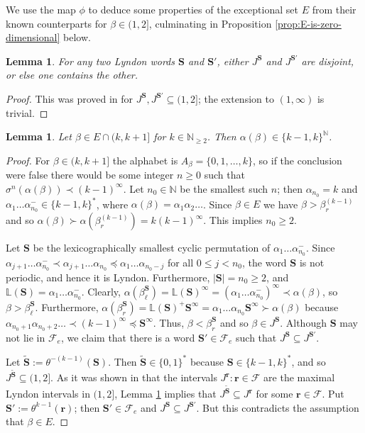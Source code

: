 \documentclass[12pt]{amsart}
\newtheorem{lemma}[theorem]{Lemma}
\theoremstyle{definition}
\theoremstyle{remark}
\numberwithin{equation}{section}
\newcommand{\N}{\ensuremath{\mathbb{N}}}
\renewcommand{\L}{\ensuremath{\mathbb{L}}}
\newcommand{\cF}{\mathcal{F}}
\newcommand{\cs}{ {\mathbf{S}}}
\renewcommand{\r}{ {\mathbf{r}}}
\newcommand{\f}{\infty}
\newcommand{\al}{\alpha}
\newcommand{\lle}{\preccurlyeq}
\newcommand{\si}{\sigma}
\begin{document}
{We use the map $\phi$ to deduce some properties of the exceptional set $E$ from their known counterparts for $\beta\in(1,2]$, culminating in Proposition \ref{prop:E-is-zero-dimensional} below.

\begin{lemma} \label{non-overlapping-intervals}
For any two Lyndon words $\cs$ and $\cs'$, either $J^\cs$ and $J^{\cs'}$ are disjoint, or else one contains the other.
\end{lemma}

\begin{proof}
This was proved in \cite{Kalle-Kong-Langeveld-Li-18} for $J^\cs, J^{\cs'}\subseteq(1,2]$; the extension to $(1,\f)$ is trivial.
\end{proof}

\begin{lemma} \label{lem:two-digits}
Let $\beta\in E\cap(k,k+1]$ for $k\in\N_{\geq 2}$. Then $\al(\beta)\in\{k-1,k\}^\N$.
\end{lemma}

\begin{proof}
For $\beta\in(k,k+1]$ the alphabet is $A_\beta=\{0,1,\dots,k\}$, so if the conclusion were false there would be some integer $n\geq 0$ such that $\si^n(\al(\beta))\prec (k-1)^\f$.  Let $n_0\in\N$ be the smallest such $n$; then $\al_{n_0}=k$ and $\al_1\dots\al_{n_0}^-\in\{k-1,k\}^*$, where $\al(\beta)=\al_1\al_2\ldots$. Since $\beta\in E$ we have $\beta>\beta_r^{(k-1)}$ and so $\al(\beta)\succ \al(\beta_r^{(k-1)})=k(k-1)^\f$. This implies $n_0\geq 2$.

Let $\cs$ be the lexicographically smallest cyclic permutation of $\al_1\dots\al_{n_0}^-$. {Since $\al_{j+1}\dots\al_{n_0}^-\prec\al_{j+1}\dots\al_{n_0}\lle \al_1\dots\al_{n_0-j}$ for all $0\le j<n_0$, the word $\cs$ is not periodic, and hence it is Lyndon.} Furthermore, $|\cs|=n_0\geq 2$, and $\L(\cs)=\al_1\dots\al_{n_0}^-$. Clearly, $\al(\beta_\ell^\cs)=\L(\cs)^\f=(\al_1\dots\al_{n_0}^-)^\f\prec\al(\beta)$, so $\beta>\beta_\ell^\cs$. Furthermore, $\al(\beta_r^\cs)=\L(\cs)^+\cs^\f=\al_1\dots\al_{n_0}\cs^\f\succ\al(\beta)$ because $\al_{n_0+1}\al_{n_0+2}\dots\prec(k-1)^\f\lle\cs^\f$. Thus, $\beta<\beta_r^\cs$ and so $\beta\in J^\cs$. Although $\cs$ may not lie in $\cF_e$, we claim that there is a word $\cs'\in\cF_e$ such that $J^\cs\subseteq J^{\cs'}$.

Let $\tilde{\cs}:=\theta^{-(k-1)}(\cs)$. Then $\tilde{\cs}\in\{0,1\}^*$ because $\cs\in\{k-1,k\}^*$, and so $J^{\tilde{\cs}}\subseteq(1,2]$. As it was shown in \cite[Proposition 4.7]{Kalle-Kong-Langeveld-Li-18} that the intervals $J^{\r}: \r\in\cF$ are the maximal Lyndon intervals in $(1,2]$, Lemma \ref{non-overlapping-intervals} implies that $J^{\tilde\cs}\subseteq J^\r$ for some $\r\in\cF$. Put $\cs':=\theta^{k-1}(\r)$; then $\cs'\in\cF_e$ and $J^\cs\subseteq J^{\cs'}$. But this contradicts the assumption that $\beta\in E$.
\end{proof}

}
\end{document}
